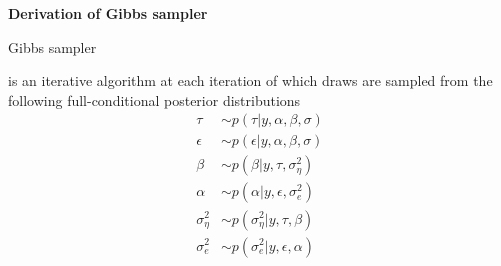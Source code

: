 \documentclass[notes,blackandwhite,mathsans,usenames,dvipsnames]{beamer}
\begin{document}
{
\begin{frame}

\begin{adjustwidth}{-0.5cm}{0cm}
\vspace{8.3cm}\Large
\textbf{{\color{mcxs2}Derivation of} {\color{mcxs1}Gibbs sampler}}
\end{adjustwidth}

\end{frame}
}

\begin{frame}{Gibbs sampler}

{\color{mcxs2}is an iterative algorithm at each iteration of which draws are sampled from the following} {\color{purple}full-conditional posterior distributions}
\begin{align*}
\tau&\sim p\left( \tau|y,\alpha,\beta,\sigma \right)\\
\epsilon&\sim p\left( \epsilon|y,\alpha,\beta,\sigma \right)\\
\beta&\sim p\left( \beta|y,\tau,\sigma^2_\eta \right)\\
\alpha&\sim p\left( \alpha|y,\epsilon,\sigma^2_e \right)\\
\sigma^2_\eta&\sim p\left( \sigma^2_\eta|y,\tau,\beta \right)\\
\sigma^2_e&\sim p\left( \sigma^2_e|y,\epsilon,\alpha \right)
\end{align*}

\end{frame}
\end{document}
